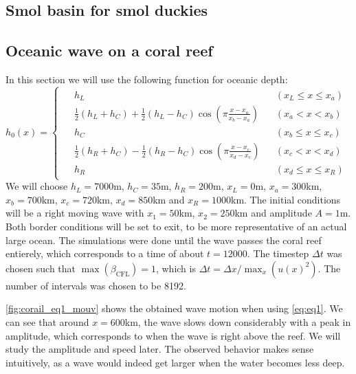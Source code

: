 \subsection{Smol basin for smol duckies}


\subsection{Oceanic wave on a coral reef}

In this section we will use the following function for oceanic depth:
\begin{equation}
    h_0(x) = \begin{cases}
        \begin{aligned}
            &\scriptstyle{h_L} &&\scriptstyle{(x_L \le x \le x_a)} \\
            &\scriptstyle{\frac{1}{2}(h_L + h_C) + \frac{1}{2}(h_L - h_C) \cos \left( \pi \frac{x-x_a}{x_b-x_a} \right)} &&\scriptstyle{(x_a < x < x_b)} \\
            &\scriptstyle{h_C} &&\scriptstyle{(x_b \le x \le x_c)} \\
            &\scriptstyle{\frac{1}{2}(h_R + h_C) - \frac{1}{2}(h_R - h_C) \cos \left( \pi \frac{x-x_c}{x_d-x_c} \right)} &&\scriptstyle{(x_c < x < x_d)} \\
            &\scriptstyle{h_R} &&\scriptstyle{(x_d \le x \le x_R)}
        \end{aligned}
    \end{cases}
\end{equation}
We will choose \(h_L = 7000\)m, \(h_C = 35\)m, \(h_R = 200\)m, \(x_L = 0\)m, \(x_a = 300\)km, \(x_b = 700\)km, \(x_c = 720\)km, \(x_d = 850\)km and \(x_R = 1000\)km. The initial conditions will be a right moving wave with \(x_1 = 50\)km, \(x_2 = 250\)km and amplitude \(A = 1\)m. Both border conditions will be set to exit, to be more representative of an actual large ocean. The simulations were done until the wave passes the coral reef entierely, which corresponds to a time of about \(t = 12000\). The timestep \(\Delta t\) was chosen such that \(\max(\beta_{\textrm{CFL}}) = 1\), which is \(\Delta t = \Delta x / \max_x(u(x)^2)\). The number of intervals was chosen to be 8192.

\autoref{fig:corail_eq1_mouv} shows the obtained wave motion when using \autoref{eq:eq1}. We can see that around \(x=600\)km, the wave slows down considerably with a peak in amplitude, which corresponds to when the wave is right above the reef. We will study the amplitude and speed later. The observed behavior makes sense intuitively, as a wave would indeed get larger when the water becomes less deep.

